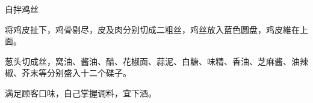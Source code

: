 \begin{recipe}{自拌鸡丝}

\ingredients


\cooking

\step 将鸡皮扯下，鸡骨剔尽，皮及肉分别切成二粗丝，鸡丝放入蓝色圆盘，鸡皮維在上
面。

\step 葱头切成丝，窝油、酱油、醋、花椒面、蒜泥、白糖、味精、香油、芝麻酱、油辣
椒、芥末等分别盛入十二个碟子。

\features

满足顾客口味，自己掌握调料，宜下酒。

\end{recipe}

